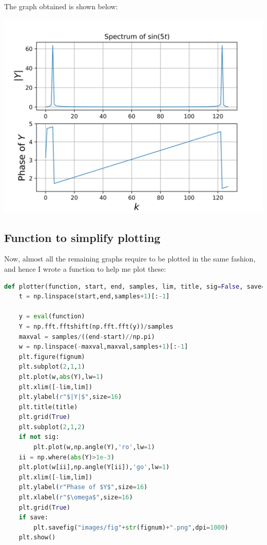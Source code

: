 \documentclass[12pt]{article}
\begin{document}
The graph obtained is shown below:
\begin{center}
    \includegraphics[scale=0.8]{images/fig0.png}
\end{center}

\subsection{Function to simplify plotting}

Now, almost all the remaining graphs require to be plotted in the same fashion, and hence I wrote a function to help me plot these:

\begin{lstlisting}[language=Python]
def plotter(function, start, end, samples, lim, title, sig=False, save=True, fignum=1):
    t = np.linspace(start,end,samples+1)[:-1]

    y = eval(function)
    Y = np.fft.fftshift(np.fft.fft(y))/samples
    maxval = samples/((end-start)//np.pi)
    w = np.linspace(-maxval,maxval,samples+1)[:-1]
    plt.figure(fignum)
    plt.subplot(2,1,1)
    plt.plot(w,abs(Y),lw=1)
    plt.xlim([-lim,lim])
    plt.ylabel(r"$|Y|$",size=16)
    plt.title(title)
    plt.grid(True)
    plt.subplot(2,1,2)
    if not sig:
        plt.plot(w,np.angle(Y),'ro',lw=1)
    ii = np.where(abs(Y)>1e-3)
    plt.plot(w[ii],np.angle(Y[ii]),'go',lw=1)
    plt.xlim([-lim,lim])
    plt.ylabel(r"Phase of $Y$",size=16)
    plt.xlabel(r"$\omega$",size=16)
    plt.grid(True)
    if save:
        plt.savefig("images/fig"+str(fignum)+".png",dpi=1000)
    plt.show()
\end{lstlisting}
\end{document}
